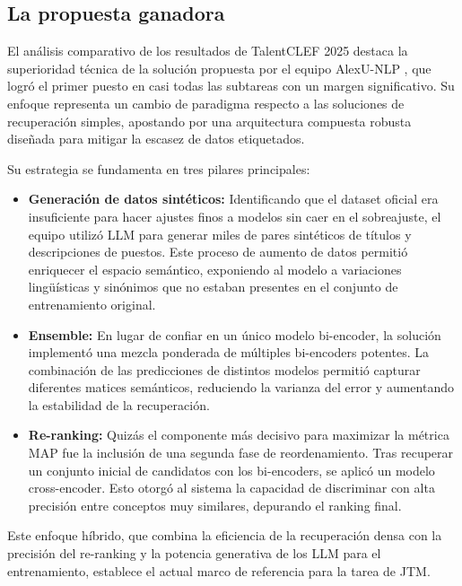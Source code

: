 \subsection{La propuesta ganadora}

\noindent El análisis comparativo de los resultados de TalentCLEF 2025 destaca la superioridad técnica de la solución propuesta por el equipo AlexU-NLP \cite{barakat2025alexu}, que logró el primer puesto en casi todas las subtareas con un margen significativo. Su enfoque representa un cambio de paradigma respecto a las soluciones de recuperación simples, apostando por una arquitectura compuesta robusta diseñada para mitigar la escasez de datos etiquetados.

Su estrategia se fundamenta en tres pilares principales:

\begin{itemize}
    \item \textbf{Generación de datos sintéticos:} Identificando que el dataset oficial era insuficiente para hacer ajustes finos a modelos sin caer en el sobreajuste, el equipo utilizó \gls{LLM} para generar miles de pares sintéticos de títulos y descripciones de puestos. Este proceso de aumento de datos permitió enriquecer el espacio semántico, exponiendo al modelo a variaciones lingüísticas y sinónimos que no estaban presentes en el conjunto de entrenamiento original.
          
    \item \textbf{Ensemble:} En lugar de confiar en un único modelo bi-encoder, la solución implementó una mezcla ponderada de múltiples bi-encoders potentes. La combinación de las predicciones de distintos modelos permitió capturar diferentes matices semánticos, reduciendo la varianza del error y aumentando la estabilidad de la recuperación.
          
    \item \textbf{Re-ranking:} Quizás el componente más decisivo para maximizar la métrica \gls{MAP} fue la inclusión de una segunda fase de reordenamiento. Tras recuperar un conjunto inicial de candidatos con los bi-encoders, se aplicó un modelo cross-encoder. Esto otorgó al sistema la capacidad de discriminar con alta precisión entre conceptos muy similares, depurando el ranking final.
\end{itemize}

Este enfoque híbrido, que combina la eficiencia de la recuperación densa con la precisión del re-ranking y la potencia generativa de los \gls{LLM} para el entrenamiento, establece el actual marco de referencia para la tarea de \gls{JTM}.

